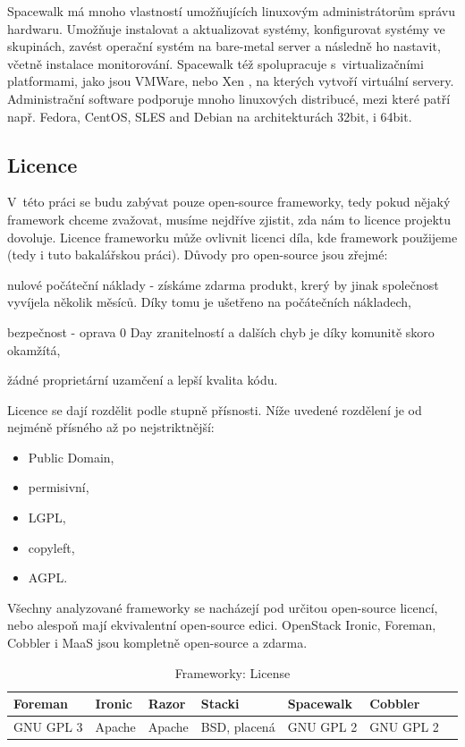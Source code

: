 Spacewalk má mnoho vlastností umožňujících linuxovým administrátorům správu hardwaru. Umožňuje instalovat a aktualizovat systémy, konfigurovat systémy ve skupinách, zavést operační systém na bare-metal server a následně ho nastavit, včetně instalace monitorování. Spacewalk též spolupracuje s~virtualizačními platformami, jako jsou VMWare, nebo Xen \cite{xen}, na kterých vytvoří virtuální servery. Administrační software podporuje mnoho linuxových distribucé, mezi které patří např. Fedora, CentOS, SLES and Debian na architekturách 32bit, i 64bit.


\subsection{Licence}

V~této práci se budu zabývat pouze open-source frameworky, tedy pokud nějaký framework chceme zvažovat, musíme nejdříve zjistit, zda nám to licence projektu dovoluje. Licence frameworku může ovlivnit licenci díla, kde framework použijeme (tedy i tuto bakalářskou práci). Důvody pro open-source jsou zřejmé:

\item nulové počáteční náklady - získáme zdarma produkt, krerý by jinak společnost vyvíjela několik měsíců. Díky tomu je ušetřeno na počátečních nákladech,
\item bezpečnost - oprava 0 Day \cite{0day} zranitelností a dalších chyb je díky komunitě skoro okamžítá,
\item žádné proprietární uzamčení a lepší kvalita kódu.

Licence se dají rozdělit podle stupně přísnosti. Níže uvedené rozdělení je od nejméně přísného až po nejstriktnější:

\begin{itemize}
\item Public Domain,
\item permisivní,
\item LGPL,
\item copyleft,
\item AGPL.
\end{itemize}

Všechny analyzované frameworky se nacházejí pod určitou open-source licencí, nebo alespoň mají ekvivalentní open-source edici. OpenStack Ironic, Foreman, Cobbler i MaaS jsou kompletně open-source a zdarma.


\begin{table}[h]
\centering
\caption{Frameworky: License}
\label{Frameworky_licence}
\begin{tabular}{lllllll}
\toprule
 Foreman & Ironic & Razor & Stacki & Spacewalk & Cobbler \\ \midrule
 GNU GPL 3    &  Apache &  Apache &  BSD, placená   &   GNU GPL 2  & GNU GPL 2
\end{tabular}
\end{table}




